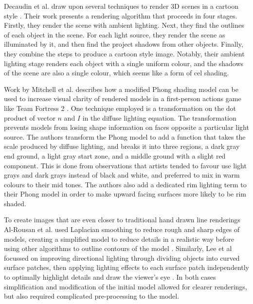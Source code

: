 Decaudin et al. draw upon several techniques to render 3D scenes in a cartoon style 
\cite{decaudin96}. Their work presents a rendering algorithm that proceeds in four stages. 
Firstly, they render the scene with ambient lighting. Next, they find the outlines of each 
object in the scene. For each light source, they render the scene as illuminated by it, and 
then find the project shadows from other objects. Finally, they combine the steps to produce 
a cartoon style image. Notably, their ambient lighting stage renders each object with a 
single uniform colour, and the shadows of the scene are also a single colour, which seems 
like a form of cel shading.

Work by Mitchell et al. describes how a modified Phong shading model can be used to increase visual
clarity of rendered models in a first-person actions game like Team Fortress 2 \cite{mitchell07}. One 
technique employed is a transformation on the dot product of vector $n$ and $I$ in 
the diffuse lighting equation. The transformation prevents models from losing shape information
on faces opposite a particular light source. The authors transform the Phong model
to add a function that takes the scale produced by diffuse lighting, and breaks it into three 
regions, a dark gray end ground, a light gray start zone, and a middle ground with a slight 
red component. This is done from observations that artists tended to favour use light grays and
dark grays instead of black and white, and preferred to mix in warm colours to their mid tones. 
The authors also add a dedicated rim lighting term to their Phong model in order to make upward
facing surfaces more likely to be rim shaded.

To create images that are even closer to traditional hand drawn line renderings Al-Rousan et al. used 
Laplacian smoothing to reduce rough and sharp edges of models, creating a simplified model to reduce 
details in a realistic way before using other algorithms to outline contours of the model \cite{riyad16}. 
Similarly, Lee et al focussed on improving directional lighting through dividing objects into curved 
surface patches, then applying lighting effects to each surface patch independently to optimally 
highlight details and draw the viewer's eye \cite{lee06}. In both cases simplification and modification 
of the initial model allowed for clearer renderings, but also required complicated pre-processing to the 
model.